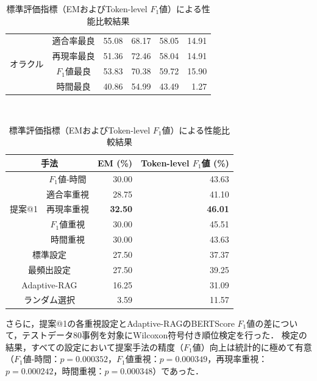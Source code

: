 \begin{table}[tb]
\begin{tabular}{ccrrrr}
    \multirow{4}{*}{オラクル}
    & 適合率最良 & 55.08 & 68.17 & 58.05 & 14.91 \\
    & 再現率最良 & 51.36 & 72.46 & 58.04 & 14.91 \\
    & $F_1$値最良 & 53.83 & 70.38 & 59.72 & 15.90 \\
    & 時間最良 & 40.86 & 54.99 & 43.49 & 1.27 \\
    \bottomrule
    \end{tabular}
\\
\vspace{2mm}
 \caption{標準評価指標（EMおよびToken-level $F_1$値）による性能比較結果}
 \label{Evaluation_of_RAG_Based_on_Standard_Metrics}
 \begin{tabular}{ccrr}
    \toprule
    \multicolumn{2}{c}{手法} & EM (\%) & Token-level $F_1$値 (\%) \\
    \midrule
    \multirow{5}{*}{提案@1} 
    & $F_1$値-時間 & 30.00 & 43.63 \\
    & 適合率重視 & 28.75 & 41.10 \\
    & 再現率重視 & \textbf{32.50} & \textbf{46.01} \\
    & $F_1$値重視 & 30.00 & 45.51 \\
    & 時間重視 & 30.00 & 43.63 \\
    \midrule
    \multicolumn{2}{c}{標準設定} & 27.50 & 37.37 \\
    \multicolumn{2}{c}{最頻出設定} & 27.50 & 39.25 \\
    \multicolumn{2}{c}{Adaptive-RAG} & 16.25 & 31.09 \\
    \multicolumn{2}{c}{ランダム選択} & 3.59 & 11.57 \\
    \bottomrule
    \end{tabular}
\end{table}

さらに，提案@1の各重視設定とAdaptive-RAGのBERTScore $F_1$値の差について，テストデータ80事例を対象にWilcoxon符号付き順位検定を行った．
検定の結果，すべての設定において提案手法の精度（$F_1$値）向上は統計的に極めて有意（$F_1$値-時間：$p=0.000352$，$F_1$値重視：$p=0.000349$，再現率重視：$p=0.000242$，時間重視：$p=0.000348$）であった．

